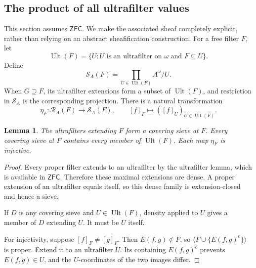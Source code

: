 \documentclass[11pt,letterpaper]{article}
\newtheorem{lemma}[theorem]{Lemma}
\theoremstyle{definition}
\theoremstyle{remark}
\newcommand{\om}{\omega}
\newcommand{\RA}{\mathscr R_A}
\newcommand{\SA}{\mathscr S_A}
\newcommand{\Ult}{\operatorname{Ult}}
\newcommand{\gen}[1]{\langle #1\rangle}
\newcommand{\co}{\mathrm c}
\newcommand{\ZFC}{\mathsf{ZFC}}
\begin{document}
\subsection{The product of all ultrafilter values}
This section assumes $\ZFC$. We make the associated sheaf completely
explicit, rather than relying on an abstract sheafification construction.
For a free filter $F$, let
\[
 \Ult(F)=\{U:U\text{ is an ultrafilter on }\om\text{ and }F\subseteq U\}.
\]
Define
\begin{equation}\label{eq:sheafification}
 \SA(F)=\prod_{U\in\Ult(F)} A^\om/U.
\end{equation}
When $G\supseteq F$, its ultrafilter extensions form a subset of
$\Ult(F)$, and restriction in $\SA$ is the corresponding projection.
There is a natural transformation
\begin{equation}\label{eq:eta}
 \eta_F:\RA(F)\longrightarrow\SA(F),\qquad
 [f]_F\longmapsto([f]_U)_{U\in\Ult(F)}.
\end{equation}

\begin{lemma}\label{lem:ultra-cover}
The ultrafilters extending $F$ form a covering sieve at $F$.
Every covering sieve at $F$ contains every member of $\Ult(F)$.
Each map $\eta_F$ is injective.
\end{lemma}
\begin{proof}
Every proper filter extends to an ultrafilter by the ultrafilter lemma,
which is available in $\ZFC$. Therefore these maximal extensions are
dense. A proper extension of an ultrafilter equals itself, so this dense
family is extension-closed and hence a sieve.

If $D$ is any covering sieve and $U\in\Ult(F)$, density applied to
$U$ gives a member of $D$ extending $U$. It must be $U$ itself.

For injectivity, suppose $[f]_F\neq[g]_F$. Then
$E(f,g)\notin F$, so $\gen{F\cup\{E(f,g)^\co\}}$ is proper.
Extend it to an ultrafilter $U$. Its containing $E(f,g)^\co$ prevents
$E(f,g)\in U$, and the $U$-coordinates of the two images differ.
\end{proof}
\end{document}
